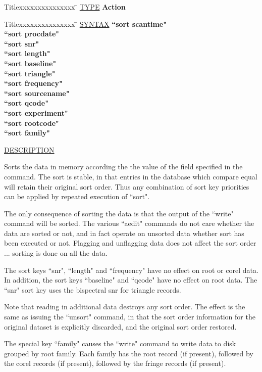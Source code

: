 \begin{tabbing}
Titlexxxxxxxxxxxxxxx \= \kill
\underline{TYPE} \> {\bf 		Action} \\
\end{tabbing}

\begin{tabbing}
Titlexxxxxxxxxxxxxxx \= \kill
\underline{SYNTAX} \> {\bf 		``sort scantime"} \\
\> {\bf 		``sort procdate"} \\
\> {\bf 		``sort snr"} \\
\> {\bf 		``sort length"} \\
\> {\bf 		``sort baseline"} \\
\> {\bf 		``sort triangle"} \\
\> {\bf 		``sort frequency"} \\
\> {\bf 		``sort sourcename"} \\
\> {\bf 		``sort qcode"} \\
\> {\bf 		``sort experiment"} \\
\> {\bf 		``sort rootcode"} \\
\> {\bf 		``sort family"} \\
\end{tabbing}

\underline{DESCRIPTION}
\begin{list}{}{\setlength{\leftmargin}{0.5in}
     \setlength{\rightmargin}{0in}}
\item
Sorts the data in memory according the the value of the
field specified in the command.  The sort is stable, in that
entries in the database which compare equal will retain
their original sort order.  Thus any combination of sort
key priorities can be applied by repeated execution of ``sort".
\item
The only consequence of sorting the data is that the output
of the ``write" command will be sorted.  The various ``aedit"
commands do not care whether the data are sorted or not, and in
fact operate on unsorted data whether sort has been executed or
not.  Flagging and unflagging data does not affect the sort
order ... sorting is done on all the data.
\item
The sort keys ``snr", ``length" and ``frequency" have no effect on
root or corel data.  In addition, the sort keys ``baseline" and
``qcode" have no effect on root data.  The ``snr" sort key uses
the bispectral snr for triangle records.
\item
Note that reading in additional data destroys any sort order.  The
effect is the same as issuing the ``unsort" command, in that
the sort order information for the original dataset is explicitly
discarded, and the original sort order restored.
\item
The special key ``family" causes the ``write" command to write data
to disk grouped by root family.  Each family has the root record
(if present), followed by the corel records (if present), followed
by the fringe records (if present).
\end{list}
\vspace{.2in}

